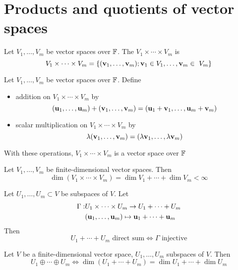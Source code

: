 \documentclass[aspectratio=169]{beamer}
\begin{document}
\section{Products and quotients of vector spaces}

\begin{frame}
\begin{definition}
Let $V_1,\ldots,V_m$ be vector spaces over $\mathbb{F}$.
The  $V_1\times\cdots\times V_m$ is
\[
V_1\times\cdots\times V_m
=\left\{
(\mathbf{v}_1,\ldots,\mathbf{v}_m); \mathbf{v}_1\in V_1,\ldots,\mathbf{v}_m\in\ V_m
\right\}
\]
\end{definition}

\begin{importanttheorem}
Let $V_1,\ldots,V_m$ be vector spaces over $\mathbb{F}$. Define
\begin{itemize}
\item addition on $V_1\times\cdots\times V_m$ by
\[
(\mathbf{u}_1,\ldots,\mathbf{u}_m)+(\mathbf{v}_1,\ldots,\mathbf{v}_m)=(\mathbf{u}_1+\mathbf{v}_1,\ldots,\mathbf{u}_m+\mathbf{v}_m)
\]
\item scalar multiplication on  $V_1\times\cdots\times V_m$ by
\[
\lambda (\mathbf{v}_1,\ldots,\mathbf{v}_m)=(\lambda \mathbf{v}_1,\ldots,\lambda \mathbf{v}_m)
\]
\end{itemize}
With these operations, $V_1\times\cdots\times V_m$ is a vector space over $\mathbb{F}$
\end{importanttheorem}
\end{frame}

\begin{frame}
\begin{importanttheorem}
Let $V_1,\ldots,V_m$ be finite-dimensional vector spaces. Then
\[
\dim(V_1\times\cdots\times V_m)=\dim V_1+\cdots+\dim V_m<\infty
\]
\end{importanttheorem}
\end{frame}

\begin{frame}
\begin{theorem}
Let $U_1,\ldots,U_m\subset V$ be subspaces of $V$. Let
\begin{eqnarray*}
\Gamma: &
U_1\times\cdots\times U_m\to U_1+\cdots+U_m \\
& (\mathbf{u}_1,\ldots,\mathbf{u}_m) \mapsto \mathbf{u}_1+\cdots+\mathbf{u}_m
\end{eqnarray*}
Then
\[
U_1+\cdots+U_m\textrm{ direct sum}
\Leftrightarrow
\Gamma\textrm{ injective}
\]
\end{theorem}
\vfill
\begin{importanttheorem}
Let $V$ be a finite-dimensional vector space, $U_1,\ldots,U_m$ subspaces of $V$. Then
\[
U_1\oplus\cdots\oplus U_m
\Leftrightarrow
\dim(U_1+\cdots+U_m)=\dim U_1+\cdots+\dim U_m
\]
\end{importanttheorem}
\end{frame}
\end{document}

